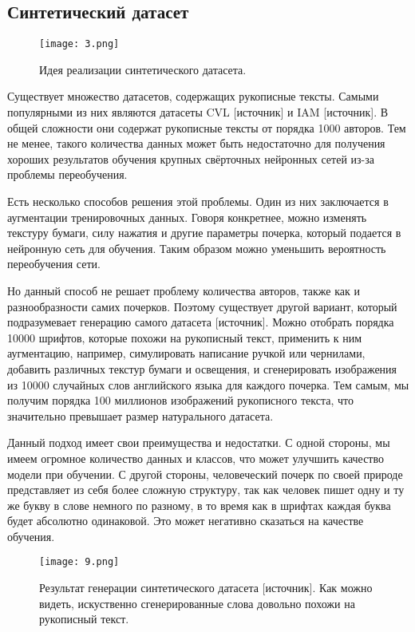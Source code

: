 \subsection{Синтетический датасет}

\begin{figure}[htbp]
    \centering
    \texttt{[image: 3.png]}
    \caption{Идея реализации синтетического датасета.}
    \label{fig:example}
\end{figure}

Существует множество датасетов, содержащих рукописные тексты. Самыми популярными из них являются датасеты CVL [источник] и IAM [источник]. В общей сложности они содержат рукописные тексты от порядка 1000 авторов. Тем не менее, такого количества данных может быть недостаточно для получения хороших результатов обучения крупных свёрточных нейронных сетей из-за проблемы переобучения. 

Есть несколько способов решения этой проблемы. Один из них заключается в аугментации тренировочных данных. Говоря конкретнее, можно изменять текстуру бумаги, силу нажатия и другие параметры почерка, который подается в нейронную сеть для обучения. Таким образом можно уменьшить вероятность переобучения сети.

Но данный способ не решает проблему количества авторов, также как и разнообразности самих почерков. Поэтому существует другой вариант, который подразумевает генерацию самого датасета [источник]. Можно отобрать порядка 10000 шрифтов, которые похожи на рукописный текст, применить к ним аугментацию, например, симулировать написание ручкой или чернилами, добавить различных текстур бумаги и освещения, и сгенерировать изображения из 10000 случайных слов английского языка для каждого почерка. Тем самым, мы получим порядка 100 миллионов изображений рукописного текста, что значительно превышает размер натурального датасета.

Данный подход имеет свои преимущества и недостатки. С одной стороны, мы имеем огромное количество данных и классов, что может улучшить качество модели при обучении. С другой стороны, человеческий почерк по своей природе представляет из себя более сложную структуру, так как человек пишет одну и ту же букву в слове немного по разному, в то время как в шрифтах каждая буква будет абсолютно одинаковой. Это может негативно сказаться на качестве обучения.

\begin{figure}[htbp]
    \centering
    \texttt{[image: 9.png]}
    \captionsetup{width=0.9\textwidth}
    \caption{Результат генерации синтетического датасета [источник]. Как можно видеть, искуственно сгенерированные слова довольно похожи на рукописный текст.}
    \label{fig:example}
\end{figure}

